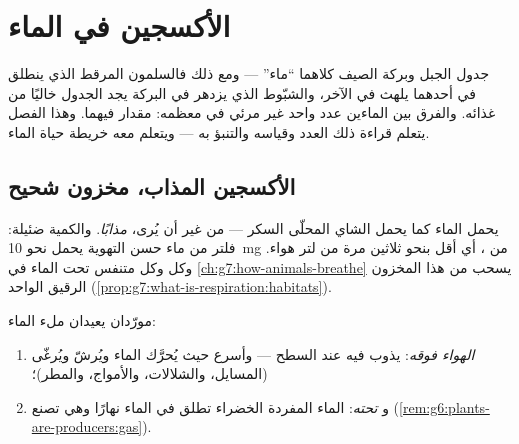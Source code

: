 \chapter{الأكسجين في الماء}\label{ch:g7:oxygen-in-the-water}

جدول الجبل وبركة الصيف كلاهما ``ماء'' --- ومع ذلك فالسلمون المرقط
الذي ينطلق في أحدهما يلهث في الآخر، والشبّوط الذي يزدهر في البركة
يجد الجدول خاليًا من غذائه. والفرق بين الماءين عدد واحد غير مرئي في
معظمه: مقدار  فيهما. وهذا الفصل يتعلم قراءة ذلك
العدد وقياسه والتنبؤ به --- ويتعلم معه خريطة حياة الماء.

\section{الأكسجين المذاب، مخزون شحيح}

\begin{definition}\label{def:g7:oxygen-in-the-water:dissolved}
يحمل الماء  كما يحمل الشاي المحلّى السكر --- من غير أن
يُرى، \emph{مذابًا}. والكمية ضئيلة: فلتر من ماء
حسن التهوية يحمل نحو \qty{10}{mg} من ، أي أقل بنحو ثلاثين
مرة من لتر هواء. وكل  وكل متنفس تحت الماء في
\cref{ch:g7:how-animals-breathe} يسحب من هذا المخزون الرقيق الواحد
(\cref{prop:g7:what-is-respiration:habitats}).
\end{definition}

\begin{proposition}\label{prop:g7:oxygen-in-the-water:fills}
مورّدان يعيدان ملء  الماء:
\begin{enumerate}
  \item \emph{الهواء فوقه}:  يذوب فيه عند السطح ---
        وأسرع حيث يُحرَّك الماء ويُرشّ ويُرغّى (المسايل،
        والشلالات، والأمواج، والمطر)؛
  \item و\emph{ تحته}:  الماء  المفردة
        الخضراء تطلق  في الماء نهارًا وهي تصنع
        (\cref{rem:g6:plants-are-producers:gas}).
\end{enumerate}
\end{proposition}
\admitted

